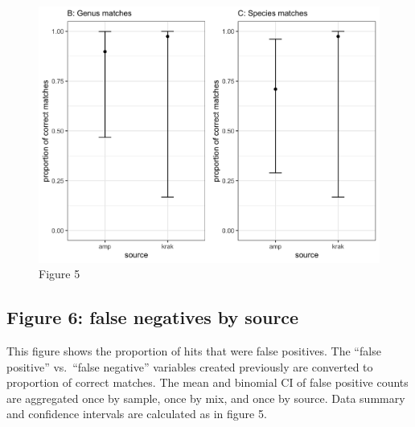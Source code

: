 \documentclass[
]{article}
\begin{document}
\begin{figure}
\centering
\includegraphics{fig5_combined.jpg}
\caption{Figure 5}
\end{figure}

\hypertarget{figure-6-false-negatives-by-source}{%
\subsection{Figure 6: false negatives by
source}\label{figure-6-false-negatives-by-source}}

This figure shows the proportion of hits that were false positives. The
``false positive'' vs.~``false negative'' variables created previously
are converted to proportion of correct matches. The mean and binomial CI
of false positive counts are aggregated once by sample, once by mix, and
once by source. Data summary and confidence intervals are calculated as
in figure 5.
\end{document}

